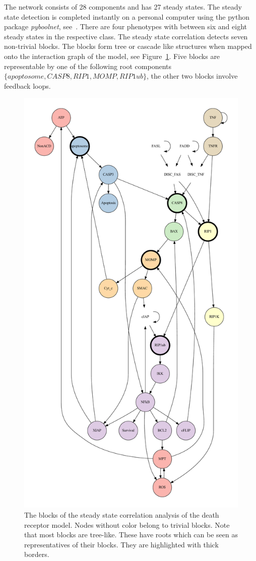 \documentclass[11pt]{article}
\begin{document}
    The network consists of 28 components and has 27 steady states.
    The steady state detection is completed instantly on a personal computer using the python package \emph{pyboolnet}, see~\cite{klarner2017pyboolnet}.
    There are four phenotypes with between six and eight steady states in the respective class.
    The steady state correlation detects seven non-trivial blocks.
    The blocks form tree or cascade like structures when mapped onto the interaction graph of the model, see Figure~\ref{fig:igraph-steady-states}.
    Five blocks are representable by one of the following root components $\{apoptosome, CASP8, RIP1, MOMP, RIP1ub\}$, the other two blocks involve feedback loops.

    \begin{figure}
        \centering
        \includegraphics[width=0.7\linewidth]{igraph_steady_states}
        \caption{
            The blocks of the steady state correlation analysis of the death receptor model.
            Nodes without color belong to trivial blocks. Note that most blocks are tree-like.
            These have roots which can be seen as representatives of their blocks.
            They are highlighted with thick borders.}
        \label{fig:igraph-steady-states}
    \end{figure}
\end{document}
